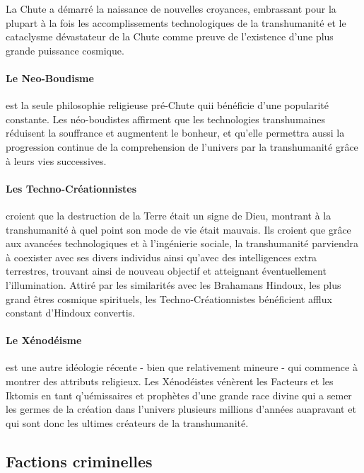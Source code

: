                                              La Chute a démarré la naissance de nouvelles croyances, embrassant pour la plupart à la fois les accomplissements technologiques de la transhumanité et le cataclysme dévastateur de la Chute comme preuve de l'existence d'une plus grande puissance cosmique. 

                                             \paragraph {Le Neo-Boudisme} \label{sec:neo-buddhism} est la seule philosophie religieuse pré-Chute quii bénéficie d'une popularité constante. Les néo-boudistes affirment que les technologies transhumaines réduisent la souffrance et augmentent le bonheur, et qu'elle permettra aussi la progression continue de la comprehension de l'univers par la transhumanité grâce à leurs vies successives. 

                                             \paragraph {Les Techno-Créationnistes} \label{sec:techno-creationists} croient que la destruction de la Terre était un signe de Dieu, montrant à la transhumanité à quel point son mode de vie était mauvais. Ils croient que grâce aux avancées technologiques et à l'ingénierie sociale, la transhumanité parviendra à coexister avec ses divers individus ainsi qu'avec des intelligences extra terrestres, trouvant ainsi de nouveau objectif et atteignant éventuellement l'illumination. Attiré par les similarités avec les Brahamans Hindoux, les plus grand êtres cosmique spirituels, les Techno-Créationnistes bénéficient afflux constant d'Hindoux convertis. 

                                             \paragraph {Le Xénodéisme} \label{sec:xenodeism} est une autre idéologie récente - bien que relativement mineure - qui commence à montrer des attributs religieux. Les Xénodéistes vénèrent les Facteurs et les Iktomis en tant q'uémissaires et prophètes d'une grande race divine qui a semer les germes de la création dans l'univers plusieurs millions d'années auapravant et qui sont donc les ultimes créateurs de la transhumanité. 

                                             \subsection{Factions criminelles} \label{sec:criminal-factions} 

